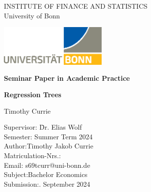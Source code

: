 \thispagestyle{empty}

\begin{center}

    \vspace*{-8mm}

    {\LARGE INSTITUTE OF FINANCE AND STATISTICS\\[1mm]}
    \large University of Bonn\\

    \vspace*{1cm}

    \includegraphics[width=0.4\textwidth]{./Graphics/UNI_Bonn_Logo_Standard_RZ.eps}

    \vspace*{1cm}

    {\Large \textbf{Seminar Paper in Academic Practice}}\\

    \vspace{1cm}

    {\Large \textbf{Regression Trees}}\\
    \vspace{1.5cm}

    {\LARGE Timothy Currie}\\[15mm]

    \parbox{120mm}{\begin{large}
            \begin{tabbing}
                Supervisor: \hspace{1.8cm} \= Dr. Elias Wolf\\[1.5mm]
                Semester:\> Summer Term 2024\\[1.5mm]
                Author:\>Timothy Jakob Currie\\[1.5mm] %
                Matriculation-Nrs.:\\[1.5mm]
                Email:\> s69tcurr@uni-bonn.de\\[1.5mm]
                Subject:\>Bachelor Economics\\[1.5mm]
                Submission:. September 2024\\[1.5mm]
            \end{tabbing}
        \end{large}
    }

\end{center}
\clearpage{\pagestyle{empty}\cleardoublepage}
